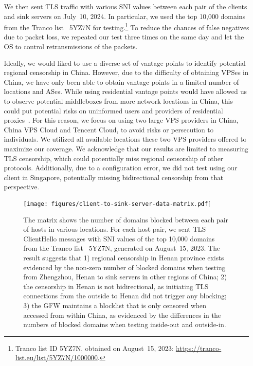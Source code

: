 \documentclass[conference,compsoc]{IEEEtran}
\begin{document}
We then sent TLS traffic with various SNI values between each pair of the clients and sink servers
on July~10, 2024.
In particular,
we used the top 10,000 domains
from the Tranco list~\cite{LePochat2019tranco} 5YZ7N for testing.\footnote{Tranco list ID 5YZ7N, obtained on August~15, 2023: \url{https://tranco-list.eu/list/5YZ7N/1000000}.}
To reduce the chances of false negatives due to packet loss,
we repeated our test three times on the same day and let the OS to control retransmissions of the packets.

Ideally,
we would liked to use a diverse set of vantage points to identify potential regional censorship in China.
However,
due to the difficulty of obtaining VPSes in China,
we have only been able to obtain vantage points in a limited number of locations and ASes.
While using residential vantage points would have allowed us to observe potential middleboxes
from more network locations in China,
this could put potential risks on uninformed users and providers of residential proxies~\cite{Mi2019-resident-evil}.
For this reason,
we focus on using two large VPS providers in China,
China VPS Cloud and Tencent Cloud,
to avoid risks or persecution to individuals.
We utilized all available locations these two VPS providers offered to maximize our coverage.
We acknowledge that our results are limited to measuring TLS censorship,
which could potentially miss regional censorship of other protocols.
Additionally, due to a configuration error,
we did not test using our client in Singapore,
potentially missing bidirectional censorship from that perspective.

\begin{figure}[t]
  \centering
  \texttt{[image: figures/client-to-sink-server-data-matrix.pdf]}
  \caption{
    The matrix shows the number of domains blocked between each pair of hosts in various locations.
%
    For each host pair,
    we sent TLS ClientHello messages with SNI values
    of the top 10,000 domains from the Tranco list~\cite{LePochat2019tranco} 5YZ7N,
    generated on August~15, 2023.
%
    The result suggests that
    1) regional censorship in Henan province exists
    evidenced by the non-zero number of blocked domains when testing from Zhengzhou, Henan to
    sink servers in other regions of China;
    2) the censorship in Henan is not bidirectional,
    as initiating TLS connections from the outside to Henan did not trigger any blocking;
    3) the GFW maintains a blocklist that is only censored when accessed from within China,
    as evidenced by the differences in the numbers of blocked domains when testing inside-out and outside-in.
  }
  \label{fig:indentification-exp}
\end{figure}
\end{document}
